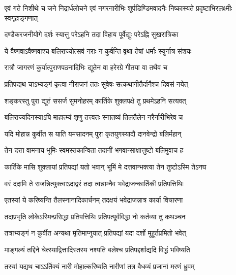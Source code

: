 \threelineshloka
{एवं गते निशीथे च जने निद्रार्धलोचने}
{एवं नगरनारीभिः शूर्पडिण्डिमवादनैः}
{निष्कास्यते प्रदृष्टाभिरलक्ष्मीः स्वगृहाङ्गणात्} %

\twolineshloka
{दण्डैकरजनीयोगे दर्शः स्यात्तु परेऽहनि}
{तदा विहाय पूर्वेद्युः परेऽह्नि सुखरात्रिका} %

\twolineshloka
{ये वैष्णवाऽवैष्णवाश्च बलिराज्योत्सवं नराः}
{न कुर्वन्ति वृथा तेषां धर्माः स्युर्नात्र संशयः} %

\twolineshloka
{रात्रौ जागरणं कुर्यात्पुराणपठनादिभिः}
{द्यूतेन वा हरेरग्रे गीतया वा तथैव च} %





\twolineshloka
{प्रतिपद्यथ चाऽभ्यङ्गं कृत्वा नीराजनं ततः}
{सुवेषः सत्कथागीतैर्दानैश्च दिवसं नयेत्} %

\twolineshloka
{शङ्करस्तु पुरा द्यूतं ससर्ज सुमनोहरम्}
{कार्तिके शुक्लपक्षे तु प्रथमेऽहनि सत्यवत्} %

\twolineshloka
{बलिराज्यदिनस्याऽपि माहात्म्यं शृणु तत्त्वतः}
{स्नातव्यं तिलतैलेन नरैर्नारीभिरेव च} %

\twolineshloka
{यदि मोहान्न कुर्वीत स याति यमसादनम्}
{पुरा कृतयुगस्यादौ दानवेन्द्रो बलिर्महान्} %

\twolineshloka
{तेन दत्ता वामनाय भूमिः स्वमस्तकान्विता}
{तदानीं भगवान्साक्षात्तुष्टो बलिमुवाच ह} %

\twolineshloka
{कार्तिके मासि शुक्लायां प्रतिपद्यां यतो भवान्}
{भूमिं मे दत्तवान्भक्त्या तेन तुष्टोऽस्मि तेऽनघ} %

\twolineshloka
{वरं ददामि ते राजन्नित्युक्त्वाऽदाद्वरं तदा}
{त्वन्नाम्नैव भवेद्राजन्कार्तिकी प्रतिपत्तिथिः} %

\twolineshloka
{एतस्यां ये करिष्यन्ति तैलस्नानादिकार्चनम्}
{तदक्षयं भवेद्राजन्नात्र कार्या विचारणा} %

\twolineshloka
{तदाप्रभृति लोकेऽस्मिन्प्रसिद्धा प्रतिपत्तिथिः}
{प्रतिपत्पूर्वविद्धा नो कर्तव्या तु कथञ्चन} %

\twolineshloka
{तत्राभ्यङ्गं न कुर्वीत अन्यथा मृतिमाप्नुयात्}
{प्रतिपद्यां यदा दर्शो मुहूर्तप्रमितो भवेत्} %

\twolineshloka
{माङ्गल्यं तद्दिने चेत्स्याद्वित्तादिस्तस्य नश्यति}
{बलेश्च प्रतिपद्दर्शाद्यदि विद्धं भविष्यति} %

\twolineshloka
{तस्यां यद्यथ चाऽऽर्तिक्यं नारी मोहात्करिष्यति}
{नारीणां तत्र वैधव्यं प्रजानां मरणं ध्रुवम्} %

